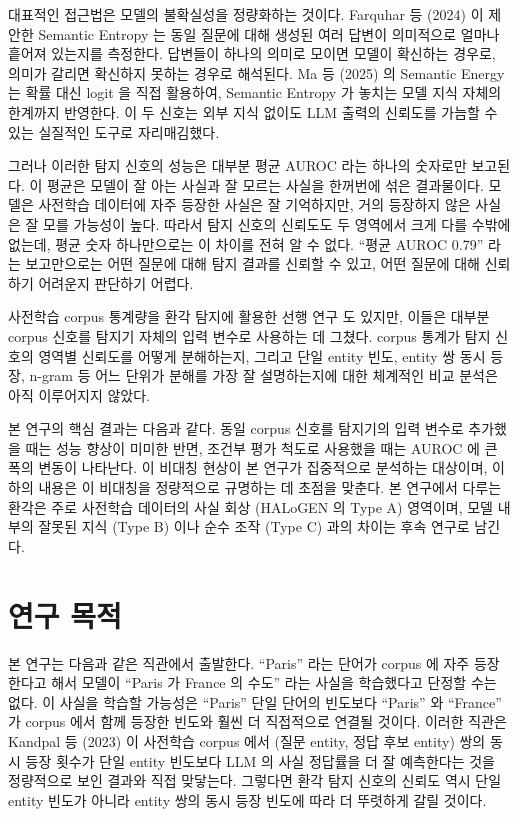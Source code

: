 \documentclass[oneside,ko,under]{snuthesis}
\begin{document}
대표적인 접근법은 모델의 불확실성을 정량화하는 것이다. Farquhar 등 (2024)\cite{farquhar2024} 이 제안한 Semantic Entropy 는 동일 질문에 대해 생성된 여러 답변이 의미적으로 얼마나 흩어져 있는지를 측정한다. 답변들이 하나의 의미로 모이면 모델이 확신하는 경우로, 의미가 갈리면 확신하지 못하는 경우로 해석된다. Ma 등 (2025)\cite{ma2025} 의 Semantic Energy 는 확률 대신 logit 을 직접 활용하여, Semantic Entropy 가 놓치는 모델 지식 자체의 한계까지 반영한다. 이 두 신호는 외부 지식 없이도 LLM 출력의 신뢰도를 가늠할 수 있는 실질적인 도구로 자리매김했다.

그러나 이러한 탐지 신호의 성능은 대부분 평균 AUROC 라는 하나의 숫자로만 보고된다. 이 평균은 모델이 잘 아는 사실과 잘 모르는 사실을 한꺼번에 섞은 결과물이다. 모델은 사전학습 데이터에 자주 등장한 사실은 잘 기억하지만, 거의 등장하지 않은 사실은 잘 모를 가능성이 높다. 따라서 탐지 신호의 신뢰도도 두 영역에서 크게 다를 수밖에 없는데, 평균 숫자 하나만으로는 이 차이를 전혀 알 수 없다. ``평균 AUROC 0.79'' 라는 보고만으로는 어떤 질문에 대해 탐지 결과를 신뢰할 수 있고, 어떤 질문에 대해 신뢰하기 어려운지 판단하기 어렵다.

사전학습 corpus 통계량을 환각 탐지에 활용한 선행 연구\cite{wildhallucinations2024, zhang2025corpus, ravichander2025halogen} 도 있지만, 이들은 대부분 corpus 신호를 탐지기 자체의 입력 변수로 사용하는 데 그쳤다. corpus 통계가 탐지 신호의 영역별 신뢰도를 어떻게 분해하는지, 그리고 단일 entity 빈도, entity 쌍 동시 등장, n-gram 등 어느 단위가 분해를 가장 잘 설명하는지에 대한 체계적인 비교 분석은 아직 이루어지지 않았다.

본 연구의 핵심 결과는 다음과 같다. 동일 corpus 신호를 탐지기의 입력 변수로 추가했을 때는 성능 향상이 미미한 반면, 조건부 평가 척도로 사용했을 때는 AUROC 에 큰 폭의 변동이 나타난다. 이 비대칭 현상이 본 연구가 집중적으로 분석하는 대상이며, 이하의 내용은 이 비대칭을 정량적으로 규명하는 데 초점을 맞춘다. 본 연구에서 다루는 환각은 주로 사전학습 데이터의 사실 회상 (HALoGEN\cite{ravichander2025halogen} 의 Type A) 영역이며, 모델 내부의 잘못된 지식 (Type B) 이나 순수 조작 (Type C) 과의 차이는 후속 연구로 남긴다.

\section{연구 목적}

본 연구는 다음과 같은 직관에서 출발한다. ``Paris'' 라는 단어가 corpus 에 자주 등장한다고 해서 모델이 ``Paris 가 France 의 수도'' 라는 사실을 학습했다고 단정할 수는 없다. 이 사실을 학습할 가능성은 ``Paris'' 단일 단어의 빈도보다 ``Paris'' 와 ``France'' 가 corpus 에서 함께 등장한 빈도와 훨씬 더 직접적으로 연결될 것이다. 이러한 직관은 Kandpal 등 (2023)\cite{kandpal2023longtail} 이 사전학습 corpus 에서 (질문 entity, 정답 후보 entity) 쌍의 동시 등장 횟수가 단일 entity 빈도보다 LLM 의 사실 정답률을 더 잘 예측한다는 것을 정량적으로 보인 결과와 직접 맞닿는다. 그렇다면 환각 탐지 신호의 신뢰도 역시 단일 entity 빈도가 아니라 entity 쌍의 동시 등장 빈도에 따라 더 뚜렷하게 갈릴 것이다.
\end{document}
